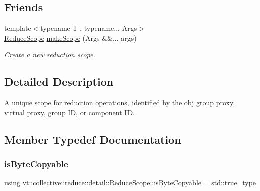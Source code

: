 \subsection*{Friends}
\begin{DoxyCompactItemize}
\item 
{\footnotesize template$<$typename T , typename... Args$>$ }\\\hyperlink{structvt_1_1collective_1_1reduce_1_1detail_1_1_reduce_scope}{Reduce\+Scope} \hyperlink{structvt_1_1collective_1_1reduce_1_1detail_1_1_reduce_scope_affabcae30d44dc7901117edf23a14884}{make\+Scope} (Args \&\&... args)
\begin{DoxyCompactList}\small\item\em Create a new reduction scope. \end{DoxyCompactList}\end{DoxyCompactItemize}


\subsection{Detailed Description}
A unique scope for reduction operations, identified by the obj group proxy, virtual proxy, group ID, or component ID. 

\subsection{Member Typedef Documentation}
\mbox{\label{structvt_1_1collective_1_1reduce_1_1detail_1_1_reduce_scope_ae92eccdf7219bb939ab3a35af7f53d47}} 
\subsubsection{\texorpdfstring{is\+Byte\+Copyable}{isByteCopyable}}
{\footnotesize\ttfamily using \hyperlink{structvt_1_1collective_1_1reduce_1_1detail_1_1_reduce_scope_ae92eccdf7219bb939ab3a35af7f53d47}{vt\+::collective\+::reduce\+::detail\+::\+Reduce\+Scope\+::is\+Byte\+Copyable} =  std\+::true\+\_\+type}

\mbox{\label{structvt_1_1collective_1_1reduce_1_1detail_1_1_reduce_scope_aac14cd07e9678d96b761d90aa1ed3bb0}} 
